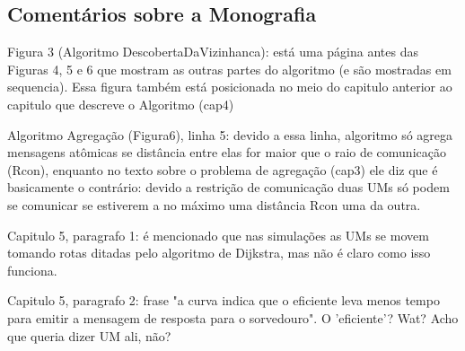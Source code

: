 \documentclass[a4paper,11pt]{article}
\begin{document}
\subsection{Comentários sobre a Monografia}
Figura 3 (Algoritmo DescobertaDaVizinhanca): está uma página antes das Figuras 4, 5 e 6
que mostram as outras partes do algoritmo (e são mostradas em sequencia). Essa figura
também está posicionada no meio do capitulo anterior ao capitulo que descreve o Algoritmo (cap4)

Algoritmo Agregação (Figura6), linha 5: devido a essa linha, algoritmo só agrega mensagens
atômicas se distância entre elas for maior que o raio de comunicação (Rcon), enquanto no texto
sobre o problema de agregação (cap3) ele diz que é basicamente o contrário: devido a restrição de 
comunicação duas UMs só podem se comunicar se estiverem a no máximo uma distância Rcon uma da outra.

Capitulo 5, paragrafo 1: é mencionado que nas simulações as UMs se movem tomando rotas ditadas
pelo algoritmo de Dijkstra, mas não é claro como isso funciona.

Capitulo 5, paragrafo 2: frase "a curva indica que o eficiente leva menos tempo para emitir a
mensagem de resposta para o sorvedouro". O 'eficiente'? Wat? Acho que queria dizer UM ali, não?
\end{document}
